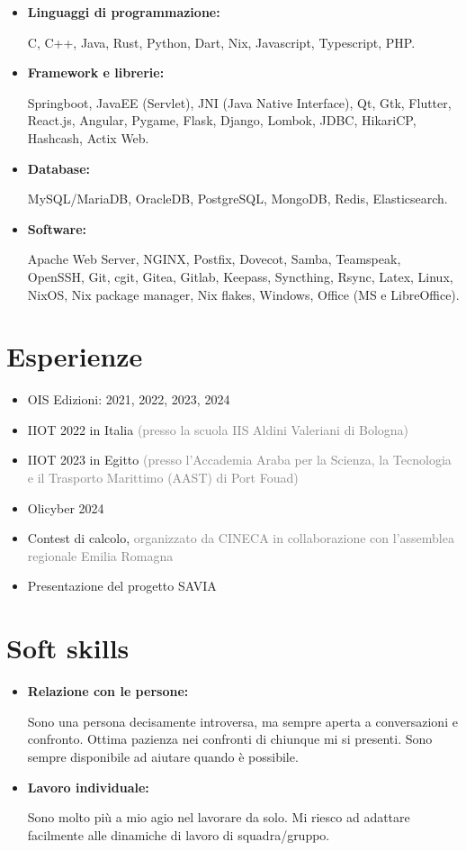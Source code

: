 \documentclass{paper}
\begin{document}
\begin{itemize}
    \item \textbf{Linguaggi di programmazione:}

    C, C++, Java, Rust, Python, Dart, Nix, Javascript, Typescript, PHP.

    \item \textbf{Framework e librerie:}

    Springboot, JavaEE (Servlet), JNI (Java Native Interface), Qt, Gtk, Flutter, React.js, Angular, Pygame, Flask, Django, Lombok, JDBC, HikariCP, Hashcash, Actix Web.

    \item \textbf{Database:}

    MySQL/MariaDB, OracleDB, PostgreSQL, MongoDB, Redis, Elasticsearch.

    \item \textbf{Software:}

    Apache Web Server, NGINX, Postfix, Dovecot, Samba, Teamspeak, OpenSSH, Git, cgit, Gitea, Gitlab, Keepass, Syncthing, Rsync, Latex, Linux, NixOS, Nix package manager, Nix flakes, Windows, Office (MS e LibreOffice).
\end{itemize}

\section{Esperienze}

\begin{itemize}
    \item OIS Edizioni: 2021, 2022, 2023, 2024
    \item IIOT 2022 in Italia \textcolor{gray}{(presso la scuola IIS Aldini Valeriani di Bologna)}
    \item IIOT 2023 in Egitto \textcolor{gray}{(presso l'Accademia Araba per la Scienza, la Tecnologia e il Trasporto Marittimo (AAST) di Port Fouad)}
    \item Olicyber 2024
    \item Contest di calcolo, \textcolor{gray}{organizzato da CINECA in collaborazione con l'assemblea regionale Emilia Romagna}
    \item Presentazione del progetto SAVIA
\end{itemize}

\section{Soft skills}

\begin{itemize}
    \item \textbf{Relazione con le persone:}

    Sono una persona decisamente introversa, ma sempre aperta a conversazioni e confronto.
    Ottima pazienza nei confronti di chiunque mi si presenti.
    Sono sempre disponibile ad aiutare quando è possibile.

    \item \textbf{Lavoro individuale:}

    Sono molto più a mio agio nel lavorare da solo.
    Mi riesco ad adattare facilmente alle dinamiche di lavoro di squadra/gruppo.
\end{itemize}
\end{document}
